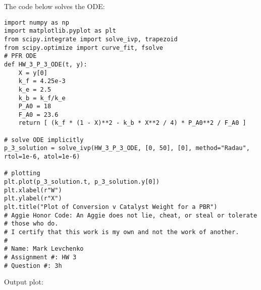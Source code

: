 \documentclass[12pt]{article}
\begin{document}
\begin{enumerate}
\begin{enumerate}
        The code below solves the ODE:

\begin{verbatim}
import numpy as np
import matplotlib.pyplot as plt
from scipy.integrate import solve_ivp, trapezoid
from scipy.optimize import curve_fit, fsolve
# PFR ODE
def HW_3_P_3_ODE(t, y):
    X = y[0]
    k_f = 4.25e-3
    k_e = 2.5
    k_b = k_f/k_e
    P_A0 = 18
    F_A0 = 23.6
    return [ (k_f * (1 - X)**2 - k_b * X**2 / 4) * P_A0**2 / F_A0 ]

# solve ODE implicitly
p_3_solution = solve_ivp(HW_3_P_3_ODE, [0, 50], [0], method="Radau", rtol=1e-6, atol=1e-6)

# plotting
plt.plot(p_3_solution.t, p_3_solution.y[0])
plt.xlabel(r"W")
plt.ylabel(r"X")
plt.title("Plot of Conversion v Catalyst Weight for a PBR")
# Aggie Honor Code: An Aggie does not lie, cheat, or steal or tolerate
# those who do.
# I certify that this work is my own and not the work of another.
#
# Name: Mark Levchenko
# Assignment #: HW 3
# Question #: 3h
\end{verbatim}

        Output plot:

        
    \end{enumerate}






    
\end{enumerate}
\end{document}

